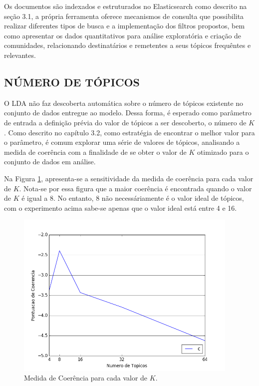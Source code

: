 \documentclass[12pt,a4paper]{article}
\begin{document}
Os documentos são indexados e estruturados no Elasticsearch como descrito na seção 3.1, a própria ferramenta oferece mecanismos de consulta que possibilita realizar diferentes tipos de busca e a implementação dos filtros propostos, bem como apresentar os dados quantitativos para análise exploratória e criação de comunidades, relacionando destinatários e remetentes a seus tópicos frequêntes e relevantes.

\subsection{NÚMERO DE TÓPICOS}

O LDA não faz descoberta automática  sobre o número de tópicos existente no conjunto de dados entregue ao modelo. Dessa forma,
 é esperado como parâmetro de entrada a definição prévia do valor de tópicos a ser descoberto, o número de $K$. Como descrito no capítulo 3.2, como estratégia de encontrar o melhor valor para o parâmetro, é comum explorar uma série de valores de tópicos, analisando  a medida de coerência com a finalidade de se obter o valor de $K$ otimizado para o conjunto de dados em análise.

Na Figura \ref{fig-cm-4-to-64}, apresenta-se a sensitividade da medida de coerência para cada valor de $K$. Nota-se por essa figura que a maior coerência é encontrada quando o valor de $K$ é igual a 8. No entanto, 8 não necessáriamente é o valor ideal de tópicos, com o experimento acima sabe-se apenas que o valor ideal está entre 4 e 16.

\begin{figure}[H]
	\centering
    \includegraphics[height=8cm]{images/figure_5.png}
    \caption{Medida de Coerência para cada valor de $K$.}
    \label{fig-cm-4-to-64}
\end{figure}
\end{document}
